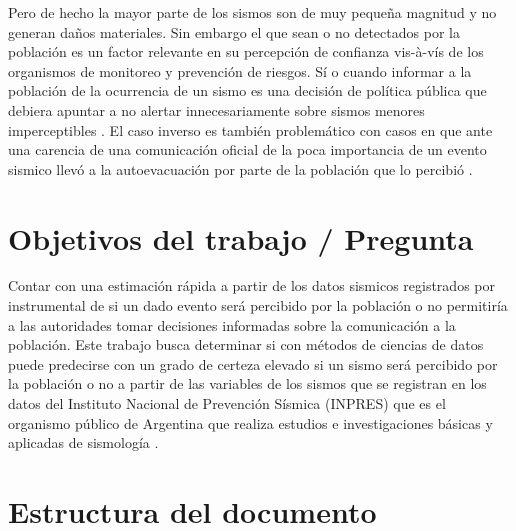 \documentclass[a4paper]{report}
\begin{document}
Pero de hecho la mayor parte de los sismos son de muy pequeña magnitud y no generan daños materiales.
Sin embargo el que sean o no detectados por la población es un factor relevante en su percepción de confianza vis-à-vís de los organismos de monitoreo y prevención de riesgos.
Sí o cuando informar a la población de la ocurrencia de un sismo es una decisión de política pública que debiera apuntar a no alertar  innecesariamente sobre sismos menores imperceptibles \cite{saunders_j_k_twist_nodate}.
El caso inverso es también problemático con casos en que ante una carencia de una comunicación oficial de la poca importancia de un evento sismico llevó a la autoevacuación por parte de la población que lo percibió \cite{vaiciulyte_population_2022}. 


\section{Objetivos del trabajo / Pregunta}
Contar con una estimación rápida a partir de los datos sismicos registrados por instrumental de si un dado evento será percibido por la población o no permitiría a las autoridades tomar decisiones informadas sobre la comunicación a la población.
Este trabajo busca determinar si con métodos de ciencias de datos puede predecirse con un grado de certeza elevado si un sismo será percibido por la población o no a partir de las variables de los sismos que se registran en los datos del Instituto Nacional de Prevención Sísmica (INPRES) que es el organismo público de Argentina que realiza estudios e investigaciones básicas y aplicadas de sismología \cite{noauthor_instituto_2022}.



\section{Estructura del documento}
\end{document}

